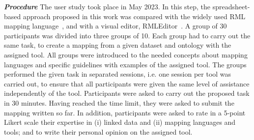 

\noindent\textit{\textbf{Procedure}} 
The user study took place in May 2023. %
In this step, the spreadsheet-based approach proposed in this work was compared with the widely used RML mapping language~\citep{Dimou2014rml}, and with a visual editor, RMLEditor~\citep{heyvaert2016rmleditor}. A group of 30 participants was divided into three groups of 10. Each group had to carry out the same task, to create a mapping from a given dataset and ontology with the assigned tool. All groups were introduced to the needed concepts about mapping languages and specific guidelines with examples of the assigned tool. The groups performed the given task in separated sessions, i.e. one session per tool was carried out, to ensure that all participants were given the same level of assistance independently of the tool. Participants were asked to carry out the proposed task in 30 minutes. Having reached the time limit, they were asked to submit the mapping written so far. In addition, participants were asked to rate in a 5-point Likert scale their expertise in (i) linked data and (ii) mapping languages and tools; and to write their personal opinion on the assigned tool.


